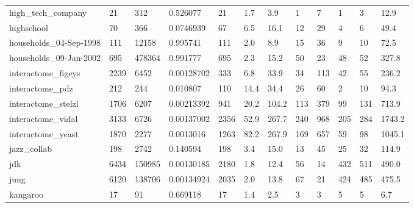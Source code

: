 \begin{longtable}{llllllllllll}
 high\_tech\_company                                  & 21         & 312       & 0.526077    & 21    & 1.7    & 3.9    & 1     & 7      & 1      & 3      & 12.9    \\
 highschool                                         & 70         & 366       & 0.0746939   & 67    & 6.5    & 16.1   & 12    & 29     & 4      & 6      & 49.4    \\
 households\_04-Sep-1998                             & 111        & 12158     & 0.995741    & 111   & 2.0    & 8.9    & 15    & 36     & 9      & 10     & 72.5    \\
 households\_09-Jan-2002                             & 695        & 478364    & 0.991777    & 695   & 2.3    & 15.2   & 50    & 23     & 48     & 52     & 327.8   \\
 interactome\_figeys                                 & 2239       & 6452      & 0.00128702  & 333   & 6.8    & 33.9   & 34    & 113    & 42     & 55     & 236.2   \\
 interactome\_pdz                                    & 212        & 244       & 0.010807    & 110   & 14.4   & 34.4   & 26    & 60     & 2      & 10     & 94.3    \\
 interactome\_stelzl                                 & 1706       & 6207      & 0.00213392  & 941   & 20.2   & 104.2  & 113   & 379    & 99     & 131    & 713.9   \\
 interactome\_vidal                                  & 3133       & 6726      & 0.00137002  & 2356  & 52.9   & 267.7  & 240   & 968    & 205    & 284    & 1743.2  \\
 interactome\_yeast                                  & 1870       & 2277      & 0.0013016   & 1263  & 82.2   & 267.9  & 169   & 657    & 59     & 98     & 1045.1  \\
 jazz\_collab                                        & 198        & 2742      & 0.140594    & 198   & 3.4    & 15.0   & 13    & 45     & 25     & 32     & 114.9   \\
 jdk                                                & 6434       & 150985    & 0.00130185  & 2180  & 1.8    & 12.4   & 56    & 14     & 432    & 511    & 490.0   \\
 jung                                               & 6120       & 138706    & 0.00134924  & 2035  & 2.0    & 13.8   & 67    & 21     & 424    & 485    & 475.5   \\
 kangaroo                                           & 17         & 91        & 0.669118    & 17    & 1.4    & 2.5    & 3     & 3      & 5      & 5      & 6.7     \\

\end{longtable}
